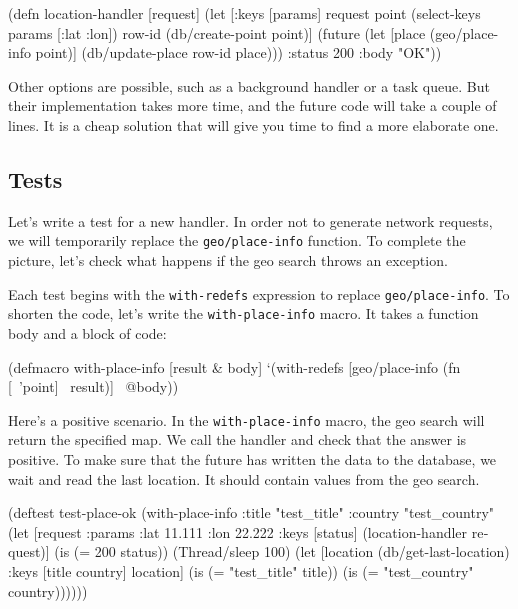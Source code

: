 \else

\begin{english}
  \begin{clojure}
(defn location-handler
  [request]
  (let [{:keys [params]} request
        point (select-keys params [:lat :lon])
        row-id (db/create-point point)]
    (future
      (let [place (geo/place-info point)]
        (db/update-place row-id place)))
    {:status 200 :body "OK"}))
  \end{clojure}
\end{english}

\fi

Other options are possible, such as a background handler or a task queue.
But their implementation takes more time, and the future code will take a couple of lines. It is a cheap solution that will give you time to find a more elaborate one.

\subsection{Tests}


Let's write a test for a new handler.
In order not to generate network requests, we will temporarily replace the \verb|geo/place-info| function. 
To complete the picture, let's check what happens if the geo search throws an exception.

Each test begins with the \verb|with-redefs| expression to replace \verb|geo/place-info|.
To shorten the code, let's write the \verb|with-place-info| macro.
It takes a function body and a block of code:

\begin{english}
  \begin{clojure}
(defmacro with-place-info
  [result & body]
  `(with-redefs [geo/place-info
                 (fn [~'point] ~result)]
     ~@body))
  \end{clojure}
\end{english}

Here's a positive scenario.
In the \verb|with-place-info| macro, the geo search will return the specified map.
We call the handler and check that the answer is positive. To make sure that the future has written the data to the database, we wait and read the last location.
It should contain values from the geo search.

\ifx\DEVICETYPE\MOBILE

\begin{english}
  \begin{clojure}
(deftest test-place-ok
  (with-place-info
    {:title "test_title"
     :country "test_country"}
    (let [request {:params
                   {:lat 11.111
                    :lon 22.222}}
          {:keys [status]}
          (location-handler request)]
      (is (= 200 status))
      (Thread/sleep 100)
      (let [location
            (db/get-last-location)
            {:keys [title country]}
            location]
        (is (= "test_title" title))
        (is (= "test_country"
               country))))))
  \end{clojure}
\end{english}

